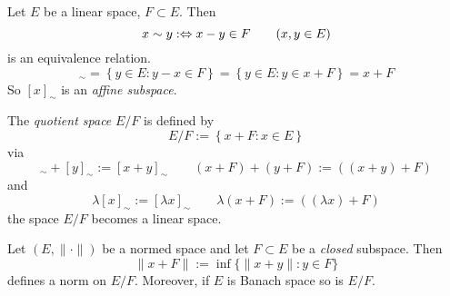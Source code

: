 \begin{definition}[Quotientspace]
	Let $E$ be a linear space, $F \subset E$. Then
	\begin{equation*}
		x \sim y :\Leftrightarrow x-y \in F \qquad (x,y \in E)
	\end{equation*}
	is an equivalence relation.
	\begin{equation*}
		[x]_{\sim} = \left\{ y \in E: y-x \in F \right\} = \left\{ y \in E : y \in x + F\right\} = x + F
	\end{equation*}
	So $[x]_{\sim}$ is an \emph{affine subspace}.

	The \emph{quotient space} $E / F$ is defined by
	\begin{equation*}
		E/F := \left\{ x+F : x \in E \right\}
	\end{equation*}
	via
	\begin{equation*}
		[x]_{\sim} + [y]_{\sim} := [x+y]_{\sim} \qquad (x + F) + (y + F) := ( (x+y) + F )
	\end{equation*}
	and
	\begin{equation*}
		\lambda [x]_{\sim} := [\lambda x]_{\sim} \qquad \lambda (x + F) := ( (\lambda x) + F )
	\end{equation*}
	the space $E/F$ becomes a linear space.
\end{definition}

\begin{lemma}
	Let $(E, \|\cdot\|)$ be a normed space and let $F \subset E$ be a \emph{closed} subspace. Then
	\begin{equation*}
		\|x+F\| := \inf\{ \|x+y\| : y \in F\}
	\end{equation*}
	defines a norm on $E/F$. Moreover, if $E$ is Banach space so is $E/F$.
\end{lemma}

